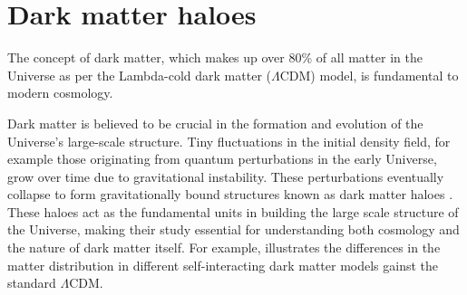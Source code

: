 

\section{Dark matter haloes}

The concept of dark matter, which makes up over 80\% of all matter in the Universe as per the Lambda-cold dark matter ($\Lambda$CDM) model, is fundamental to modern cosmology.  

Dark matter is believed to be crucial in the formation and evolution of the Universe's large-scale structure. Tiny fluctuations in the initial density field, for example those originating from quantum perturbations in the early Universe, grow over time due to gravitational instability. These perturbations eventually collapse to form gravitationally bound structures known as dark matter haloes \citep[][]{1974ApJ...187..425P,2002PhR...372....1C}. These haloes act as the fundamental units in building the large scale structure of the Universe, making their study essential for understanding both cosmology and the nature of dark matter itself. For example,  illustrates the differences in the matter distribution in different self-interacting dark matter models gainst the standard $\Lambda$CDM.

